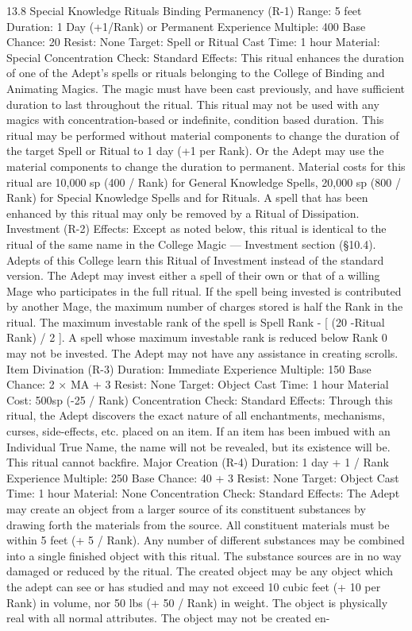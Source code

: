 \documentclass[a4paper]{article}
\begin{document}
\begin{multicols}{3}
13.8 Special Knowledge Rituals
Binding Permanency (R-1)
Range: 5 feet
Duration: 1 Day (+1/Rank) or Permanent
Experience Multiple: 400
Base Chance: 20%
Resist: None
Target: Spell or Ritual
Cast Time: 1 hour
Material: Special
Concentration Check: Standard
Effects: This ritual enhances the duration of one of
the Adept’s spells or rituals belonging to the College of Binding and Animating Magics. The magic
must have been cast previously, and have sufficient
duration to last throughout the ritual. This ritual
may not be used with any magics with concentration-based or indefinite, condition based duration.
This ritual may be performed without material
components to change the duration of the target
Spell or Ritual to 1 day (+1 per Rank). Or the
Adept may use the material components to change
the duration to permanent. Material costs for this
ritual are 10,000 sp (400 / Rank) for General
Knowledge Spells, 20,000 sp (800 / Rank) for
Special Knowledge Spells and for Rituals. A spell
that has been enhanced by this ritual may only be
removed by a Ritual of Dissipation.
Investment (R-2)
Effects: Except as noted below, this ritual is identical to the ritual of the same name in the College
Magic — Investment section (§10.4). Adepts of
this College learn this Ritual of Investment instead
of the standard version. The Adept may invest
either a spell of their own or that of a willing Mage
who participates in the full ritual. If the spell being
invested is contributed by another Mage, the
maximum number of charges stored is half the
Rank in the ritual. The maximum investable rank
of the spell is Spell Rank - [ (20 -Ritual Rank) / 2 ].
A spell whose maximum investable rank is reduced
below Rank 0 may not be invested. The Adept may
not have any assistance in creating scrolls.
Item Divination (R-3)
Duration: Immediate
Experience Multiple: 150
Base Chance: 2 × MA + 3%
Resist: None
Target: Object
Cast Time: 1 hour
Material Cost: 500sp (-25 / Rank)
Concentration Check: Standard
Effects: Through this ritual, the Adept discovers
the exact nature of all enchantments, mechanisms,
curses, side-effects, etc. placed on an item. If an
item has been imbued with an Individual True
Name, the name will not be revealed, but its existence will be. This ritual cannot backfire.
Major Creation (R-4)
Duration: 1 day + 1 / Rank
Experience Multiple: 250
Base Chance: 40 + 3%
Resist: None
Target: Object
Cast Time: 1 hour
Material: None
Concentration Check: Standard
Effects: The Adept may create an object from a
larger source of its constituent substances by drawing forth the materials from the source. All constituent materials must be within 5 feet (+ 5 /
Rank). Any number of different substances may be
combined into a single finished object with this
ritual. The substance sources are in no way damaged or reduced by the ritual. The created object
may be any object which the adept can see or has
studied and may not exceed 10 cubic feet (+ 10 per
Rank) in volume, nor 50 lbs (+ 50 / Rank) in
weight. The object is physically real with all normal attributes. The object may not be created en-


\end{multicols}
\end{document}
